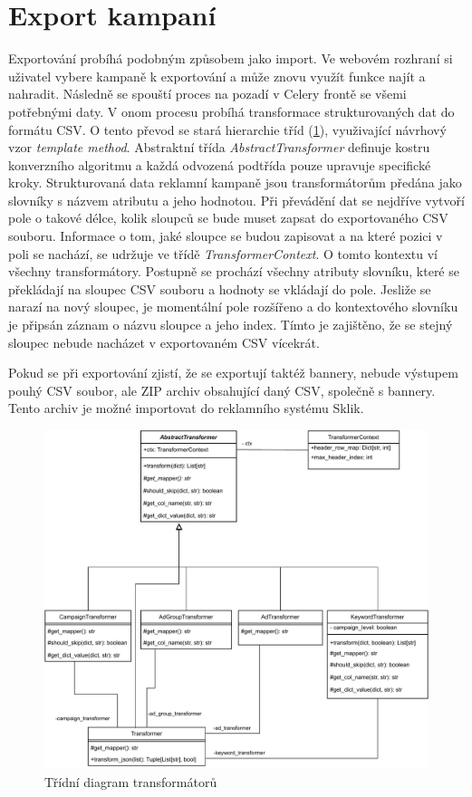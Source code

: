 \section{Export kampaní}
Exportování probíhá podobným způsobem jako import. Ve webovém rozhraní si uživatel vybere kampaně k exportování a může znovu využít funkce najít a nahradit.
Následně se spouští proces na pozadí v Celery frontě se všemi potřebnými daty. V onom procesu probíhá transformace strukturovaných dat do
formátu CSV. O tento převod se stará hierarchie tříd (\ref{fig:transformers}), využivající návrhový vzor \emph{template method}.
Abstraktní třída \emph{AbstractTransformer} definuje kostru konverzního algoritmu a každá odvozená podtřída pouze upravuje specifické
kroky. Strukturovaná data reklamní kampaně jsou transformátorům předána jako slovníky s názvem atributu a jeho hodnotou.
Při převádění dat se nejdříve vytvoří pole o takové délce, kolik sloupců se bude muset zapsat do exportovaného CSV souboru. Informace o tom, jaké sloupce
se budou zapisovat a na které pozici v poli se nachází, se udržuje ve třídě \emph{TransformerContext}. O tomto kontextu ví všechny transformátory.
Postupně se prochází všechny atributy slovníku, které se překládají na sloupec CSV souboru a hodnoty se vkládají do pole.
Jesliže se narazí na nový sloupec, je momentální pole rozšířeno a do kontextového slovníku je připsán záznam o názvu sloupce a jeho index. 
Tímto je zajištěno, že se stejný sloupec nebude nacházet v exportovaném CSV vícekrát.


Pokud se při exportování zjistí, že se exportují taktéž bannery, nebude výstupem pouhý CSV soubor, ale ZIP archiv obsahující daný CSV, společně s bannery.
Tento archiv je možné importovat do reklamního systému Sklik.

\begin{figure}[h]
    \centering
    \includegraphics[width=.8\textwidth]{Figures/Transformers.pdf}
    \caption{Třídní diagram transformátorů}
    \label{fig:transformers}
\end{figure}


\endinput